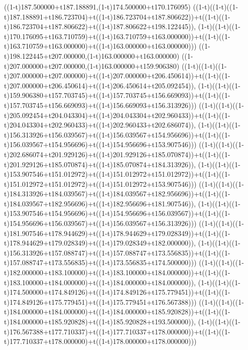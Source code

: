 ((1-t)187.500000+t187.188891,(1-t)174.500000+t170.176095)
((1-t)((1-t)((1-t)187.188891+t186.723704)+t((1-t)186.723704+t187.806622))+t((1-t)((1-t)186.723704+t187.806622)+t((1-t)187.806622+t198.122445)),                                     (1-t)((1-t)((1-t)170.176095+t163.710759)+t((1-t)163.710759+t163.000000))+t((1-t)((1-t)163.710759+t163.000000)+t((1-t)163.000000+t163.000000)))
((1-t)198.122445+t207.000000,(1-t)163.000000+t163.000000)
((1-t)207.000000+t207.000000,(1-t)163.000000+t159.906380)
((1-t)((1-t)((1-t)207.000000+t207.000000)+t((1-t)207.000000+t206.450614))+t((1-t)((1-t)207.000000+t206.450614)+t((1-t)206.450614+t205.092454)),                                     (1-t)((1-t)((1-t)159.906380+t157.703745)+t((1-t)157.703745+t156.669093))+t((1-t)((1-t)157.703745+t156.669093)+t((1-t)156.669093+t156.313926)))
((1-t)((1-t)((1-t)205.092454+t204.043304)+t((1-t)204.043304+t202.960433))+t((1-t)((1-t)204.043304+t202.960433)+t((1-t)202.960433+t202.686074)),                                     (1-t)((1-t)((1-t)156.313926+t156.039567)+t((1-t)156.039567+t154.956696))+t((1-t)((1-t)156.039567+t154.956696)+t((1-t)154.956696+t153.907546)))
((1-t)((1-t)((1-t)202.686074+t201.929126)+t((1-t)201.929126+t185.070874))+t((1-t)((1-t)201.929126+t185.070874)+t((1-t)185.070874+t184.313926)),                                     (1-t)((1-t)((1-t)153.907546+t151.012972)+t((1-t)151.012972+t151.012972))+t((1-t)((1-t)151.012972+t151.012972)+t((1-t)151.012972+t153.907546)))
((1-t)((1-t)((1-t)184.313926+t184.039567)+t((1-t)184.039567+t182.956696))+t((1-t)((1-t)184.039567+t182.956696)+t((1-t)182.956696+t181.907546)),                                     (1-t)((1-t)((1-t)153.907546+t154.956696)+t((1-t)154.956696+t156.039567))+t((1-t)((1-t)154.956696+t156.039567)+t((1-t)156.039567+t156.313926)))
((1-t)((1-t)((1-t)181.907546+t178.944629)+t((1-t)178.944629+t179.028349))+t((1-t)((1-t)178.944629+t179.028349)+t((1-t)179.028349+t182.000000)),                                     (1-t)((1-t)((1-t)156.313926+t157.088747)+t((1-t)157.088747+t173.556835))+t((1-t)((1-t)157.088747+t173.556835)+t((1-t)173.556835+t174.500000)))
((1-t)((1-t)((1-t)182.000000+t183.100000)+t((1-t)183.100000+t184.000000))+t((1-t)((1-t)183.100000+t184.000000)+t((1-t)184.000000+t184.000000)),                                     (1-t)((1-t)((1-t)174.500000+t174.849126)+t((1-t)174.849126+t175.779451))+t((1-t)((1-t)174.849126+t175.779451)+t((1-t)175.779451+t176.567388)))
((1-t)((1-t)((1-t)184.000000+t184.000000)+t((1-t)184.000000+t185.920828))+t((1-t)((1-t)184.000000+t185.920828)+t((1-t)185.920828+t193.500000)),                                     (1-t)((1-t)((1-t)176.567388+t177.710337)+t((1-t)177.710337+t178.000000))+t((1-t)((1-t)177.710337+t178.000000)+t((1-t)178.000000+t178.000000)))
